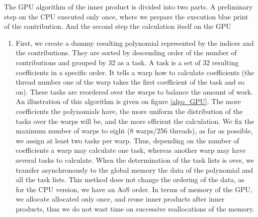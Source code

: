 \documentclass[oribibl]{llncs2e/llncs}
\begin{document}
The GPU algorithm of the inner product is divided into two parts. A preliminary step on the CPU executed only once,  where we prepare the execution blue print of the  contribution. And the second step the calculation itself on the GPU

\begin{enumerate}

\item  First, we create a dummy resulting polynomial  represented by the indices and the contributions. They are sorted by descending order of the number of contributions
and grouped by 32 as a task.   A task is a set of 32 resulting coefficients in a specific order. It tells a  warp how to calculate coefficients (the thread number one of the warp takes the first coefficient of the task and so on).
These tasks are reordered over the warps to balance the amount of work. An illustration of this algorithm is given on  figure \ref{algo_GPU}. 
The more coefficients the polynomials have, the more uniform the distribution of the tasks over the warps will be, and the more efficient the calculation.
We fix the maximum number of warps to eight (8 warps/256 threads), as far as possible, we assign at least two tasks per warp.
Thus, depending on  the number of coefficients a warp may calculate one task, whereas another warp may have several tasks to calculate.
When the determination of the task lists is over,  we transfer  asynchronously  to the global memory the data of the polynomial and all the task lists.
This method does not  change the ordering of the data, as for the CPU version, we have an AoS order.
In terms of memory of the GPU, we allocate allocated only once, and reuse inner products after inner products, thus we do not wast time on successive reallocations of the memory.


\end{enumerate}
\end{document}
